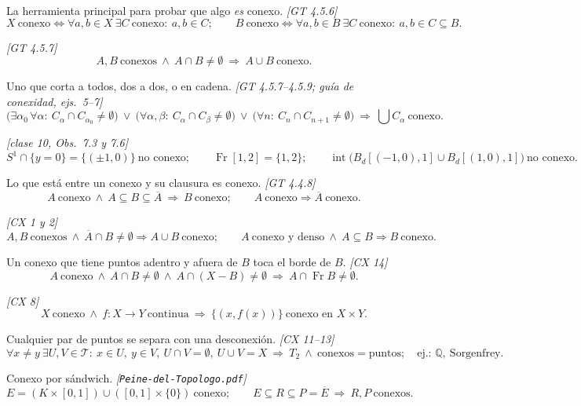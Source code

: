 \documentclass[11pt,a4paper]{article}
\theoremstyle{definition}
\theoremstyle{plain}
\newcommand{\fnt}[1]{{\normalfont\small\itshape\color{gray!150!black}[#1]}}
\newcommand{\Q}{\mathbb{Q}}
\newcommand{\cl}[1]{\overline{#1}}
\newcommand{\intr}{\operatorname{int}}
\newcommand{\fr}{\operatorname{Fr}}
\newcommand{\Bolac}[2]{B_d[#1,#2]}
\newcommand{\tp}{\mathcal{T}}
\begin{document}
\begin{itemize}[leftmargin=1.3em,itemsep=3pt]
 La herramienta principal para probar que algo \emph{es} conexo. \fnt{GT 4.5.6}
\[ X\ \text{conexo}\iff \forall a,b\in X\ \exists C\ \text{conexo}:\ a,b\in C;\qquad B\ \text{conexo}\iff\forall a,b\in B\ \exists C\ \text{conexo}:\ a,b\in C\subseteq B. \]

 \fnt{GT 4.5.7}
\[ A,B\ \text{conexos}\ \wedge\ A\cap B\ne\emptyset\ \Rightarrow\ A\cup B\ \text{conexo}. \]

 Uno que corta a todos, dos a dos, o en cadena. \fnt{GT 4.5.7--4.5.9; guía de conexidad, ejs.\ 5--7}
\[ \Big(\exists\alpha_0\,\forall\alpha:\ C_\alpha\cap C_{\alpha_0}\ne\emptyset\Big)\ \vee\ \Big(\forall\alpha,\beta:\ C_\alpha\cap C_\beta\ne\emptyset\Big)\ \vee\ \Big(\forall n:\ C_n\cap C_{n+1}\ne\emptyset\Big)\ \Rightarrow\ \textstyle\bigcup C_\alpha\ \text{conexo}. \]

 \fnt{clase 10, Obs.\ 7.3 y 7.6}
\[ S^1\cap\{y=0\}=\{(\pm1,0)\}\ \text{no conexo};\qquad \fr[1,2]=\{1,2\};\qquad \intr\big(\Bolac{(-1,0)}{1}\cup\Bolac{(1,0)}{1}\big)\ \text{no conexo}. \]

 Lo que está entre un conexo y su clausura es conexo. \fnt{GT 4.4.8}
\[ A\ \text{conexo}\ \wedge\ A\subseteq B\subseteq\cl A\ \Rightarrow\ B\ \text{conexo};\qquad A\ \text{conexo}\Rightarrow\cl A\ \text{conexo}. \]

 \fnt{CX 1 y 2}
\[ A,B\ \text{conexos}\ \wedge\ \cl A\cap B\ne\emptyset\Rightarrow A\cup B\ \text{conexo};\qquad A\ \text{conexo y denso}\ \wedge\ A\subseteq B\Rightarrow B\ \text{conexo}. \]

 Un conexo que tiene puntos adentro y afuera de $B$ toca el borde de $B$. \fnt{CX 14}
\[ A\ \text{conexo}\ \wedge\ A\cap B\ne\emptyset\ \wedge\ A\cap(X-B)\ne\emptyset\ \Rightarrow\ A\cap\fr B\ne\emptyset. \]

 \fnt{CX 8}
\[ X\ \text{conexo}\ \wedge\ f:X\to Y\ \text{continua}\ \Rightarrow\ \{(x,f(x))\}\ \text{conexo en } X\times Y. \]

 Cualquier par de puntos se separa con una desconexión. \fnt{CX 11--13}
\[ \forall x\ne y\ \exists U,V\in\tp:\ x\in U,\ y\in V,\ U\cap V=\emptyset,\ U\cup V=X\ \Rightarrow\ T_2\ \wedge\ \text{conexos}=\text{puntos};\quad \text{ej.: } \Q,\ \text{Sorgenfrey}. \]

 Conexo por sándwich. \fnt{\texttt{Peine-del-Topologo.pdf}}
\[ E=(K\times[0,1])\cup([0,1]\times\{0\})\ \text{conexo};\qquad E\subseteq R\subseteq P=\cl E\ \Rightarrow\ R,P\ \text{conexos}. \]


\end{itemize}
\end{document}
